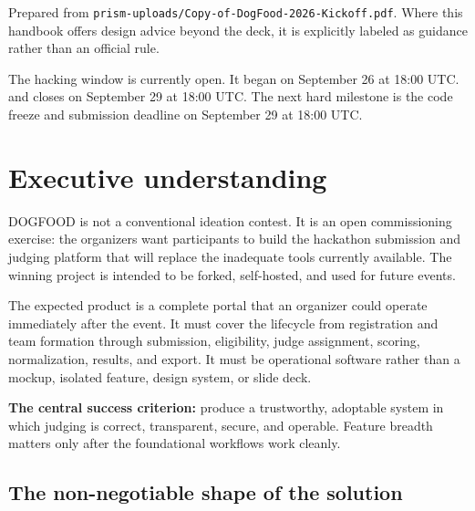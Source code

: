 \documentclass[11pt]{article}
\begin{document}
\begin{titlepage}
\vspace{8mm}
{\small Prepared from \texttt{prism-uploads/Copy-of-DogFood-2026-Kickoff.pdf}. Where this handbook offers design advice beyond the deck, it is explicitly labeled as guidance rather than an official rule.}\par
\end{titlepage}
\nopagecolor{}
\color{Ink}

\begin{keybox}[title=\textbf{Status on September 27, 2026}]
The hacking window is currently open. It began on September 26 at 18:00 UTC\@. and closes on September 29 at 18:00 UTC\@. The next hard milestone is the code freeze and submission deadline on September 29 at 18:00 UTC\@.
\end{keybox}

\tableofcontents
\clearpage

\section{Executive understanding}

DOGFOOD is not a conventional ideation contest. It is an open commissioning exercise: the organizers want participants to build the hackathon submission and judging platform that will replace the inadequate tools currently available. The winning project is intended to be forked, self-hosted, and used for future events.

The expected product is a complete portal that an organizer could operate immediately after the event. It must cover the lifecycle from registration and team formation through submission, eligibility, judge assignment, scoring, normalization, results, and export. It must be operational software rather than a mockup, isolated feature, design system, or slide deck.

\begin{keybox}
\textbf{The central success criterion:} produce a trustworthy, adoptable system in which judging is correct, transparent, secure, and operable. Feature breadth matters only after the foundational workflows work cleanly.
\end{keybox}

\subsection{The non-negotiable shape of the solution}
\end{document}
